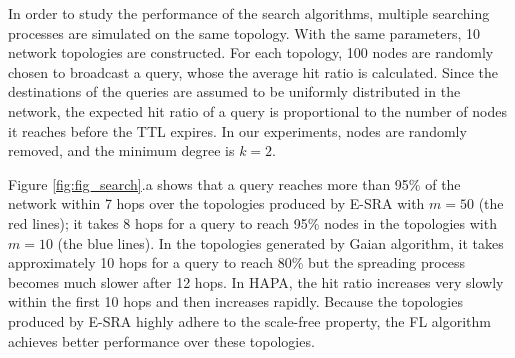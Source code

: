 In order to study the performance of the search algorithms, multiple searching processes are simulated on the same topology. With the same parameters, 10 network topologies are constructed. For each topology, 100 nodes are randomly chosen to broadcast a query, whose the average hit ratio is calculated. Since the destinations of the queries are assumed to be uniformly distributed in the network, the expected hit ratio of a query is proportional to the number of nodes it reaches before the TTL expires. In our experiments, nodes are randomly removed, and the minimum degree is $k=2$.

Figure \ref{fig:fig_search}.a shows that a query reaches more than 95\% of the network within 7 hops over the topologies produced by E-SRA with $m=50$ (the red lines); it takes 8 hops for a query to reach 95\% nodes in the topologies with $m=10$ (the blue lines). In the topologies generated by Gaian algorithm, it takes approximately 10 hops for a query to reach 80\% but the spreading process becomes much slower after 12 hops. In HAPA, the hit ratio increases very slowly within the first 10 hops and then increases rapidly. Because the topologies produced by E-SRA highly adhere to the scale-free property, the FL algorithm achieves better performance over these topologies.

